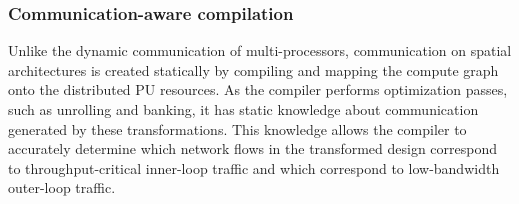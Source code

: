 \subsubsection{Communication-aware compilation}
Unlike the dynamic communication of multi-processors, communication on spatial architectures is created statically by compiling and mapping the compute graph onto the distributed PU resources.
As the compiler performs optimization passes, such as unrolling and banking, it has static knowledge about communication generated by
these transformations.
This knowledge allows the compiler to accurately determine which network flows in the transformed design correspond to throughput-critical inner-loop traffic and which correspond to low-bandwidth outer-loop traffic.

